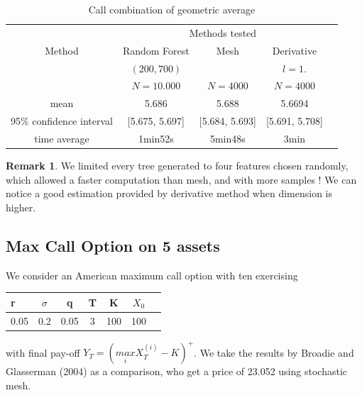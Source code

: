 \documentclass[english,11pt,openany]{report}
\theoremstyle{definition}
\theoremstyle{plain}
\theoremstyle{definition}
\newtheorem{Rem}[Th]{Remark}
\begin{document}
\begin{table}[H]
	\centering
	\caption{Call combination of geometric average }\label{table:1}
	\begin{tabular}{*5c}
		\toprule
		& \multicolumn{3}{c}{Methods tested} \\
		\cmidrule(lr){2-4}
		Method & Random Forest & Mesh & Derivative \\    
		& $(200, 700)$    & & $l=1.$  \\
		& $N = 10.000$    &  $N = 4 000$ &  $N = 4 000$  \\
		\midrule
		mean &     5.686    &  5.688 &  5.6694  \\ 
		95\% confidence interval &  [5.675, 5.697]      &  [5.684, 5.693]      & [5.691, 5.708]  \\
		time average &   1min52s     &  5min48s & 3min \\
		\bottomrule
	\end{tabular}
\end{table}

\begin{Rem}
	We limited every tree generated to four features chosen randomly, which allowed a faster computation than mesh, and with more samples !
	We can notice a good estimation provided by derivative method when dimension is higher.
\end{Rem}

\subsection{Max Call Option on 5 assets}

We consider an American maximum call option with ten exercising 

\begin{table}[H]
	\centering
	\begin{tabular}{ |l|c|c|c|c|c|c|}\hline
		r & $\sigma$ & q & T  & K   & $X_0$    \\ \hline
		0.05   & 0.2  & 0.05 & 3 & 100 & 100      \\ \hline
		
	\end{tabular}
\end{table}

with final pay-off $Y_T = \left(\underset{i}{max}X_T^{(i)} -K\right)^+$. 
We take the results by Broadie and Glasserman (2004) \cite{broadie2004stochastic} as a comparison, who get a price of 23.052 using stochastic mesh. 
\end{document}
